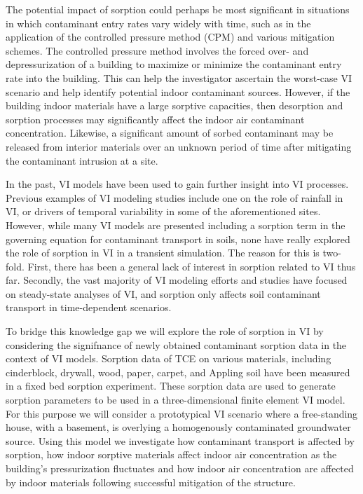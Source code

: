 The potential impact of sorption could perhaps be most significant in situations in which contaminant entry rates vary widely with time, such as in the application of the controlled pressure method (CPM) and various mitigation schemes.
The controlled pressure method involves the forced over- and depressurization of a building to maximize or minimize the contaminant entry rate into the building.
This can help the investigator ascertain the worst-case VI scenario and help identify potential indoor contaminant sources\cite{mchugh_recent_2017,holton_long-term_2015}.
However, if the building indoor materials have a large sorptive capacities, then desorption and sorption processes may significantly affect the indoor air contaminant concentration.
Likewise, a significant amount of sorbed contaminant may be released from interior materials over an unknown period of time after mitigating the contaminant intrusion at a site\cite{meininghaus_diffusion_2000,meininghaus_diffusion_2002}.\par

In the past, VI models have been used to gain further insight into VI processes. %
Previous examples of VI modeling studies include one on the role of rainfall in VI\cite{shen_numerical_2012}, or drivers of temporal variability in some of the aforementioned sites\cite{strom_factors_2019}.
However, while many VI models are presented including a sorption term in the governing equation for contaminant transport in soils, none have really explored the role of sorption in VI in a transient simulation.
The reason for this is two-fold.
First, there has been a general lack of interest in sorption related to VI thus far.
Secondly, the vast majority of VI modeling efforts and studies have focused on steady-state analyses of VI, and sorption only affects soil contaminant transport in time-dependent scenarios.\par

To bridge this knowledge gap we will explore the role of sorption in VI by considering the signifnance of newly obtained contaminant sorption data in the context of VI models.
Sorption data of TCE on various materials, including cinderblock, drywall, wood, paper, carpet, and Appling soil have been measured in a fixed bed sorption experiment.
These sorption data are used to generate sorption parameters to be used in a three-dimensional finite element VI model.
For this purpose we will consider a prototypical VI scenario where a free-standing house, with a basement, is overlying a homogenously contaminated groundwater source.
Using this model we investigate how contaminant transport is affected by sorption, how indoor sorptive materials affect indoor air concentration as the building's pressurization fluctuates and how indoor air concentration are affected by indoor materials following successful mitigation of the structure.\par
